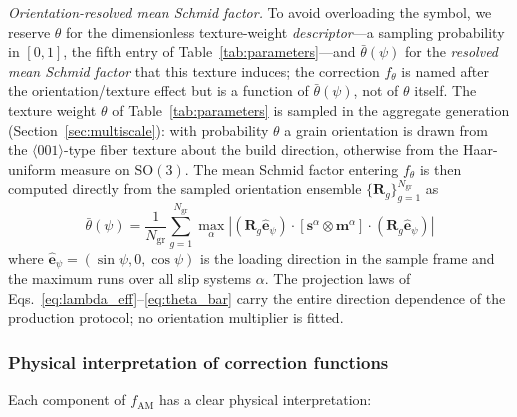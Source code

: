 \emph{Orientation-resolved mean Schmid factor.} To avoid overloading the symbol, we reserve $\theta$ for the dimensionless texture-weight \emph{descriptor}---a sampling probability in $[0,1]$, the fifth entry of Table~\ref{tab:parameters}---and $\bar{\theta}(\psi)$ for the \emph{resolved mean Schmid factor} that this texture induces; the correction $f_\theta$ is named after the orientation/texture effect but is a function of $\bar{\theta}(\psi)$, not of $\theta$ itself. The texture weight $\theta$ of Table~\ref{tab:parameters} is sampled in the aggregate generation (Section~\ref{sec:multiscale}): with probability $\theta$ a grain orientation is drawn from the $\langle001\rangle$-type fiber texture about the build direction, otherwise from the Haar-uniform measure on $\mathrm{SO}(3)$. The mean Schmid factor entering $f_\theta$ is then computed directly from the sampled orientation ensemble $\{\mathbf{R}_g\}_{g=1}^{N_{\mathrm{gr}}}$ as
\begin{equation}
\bar{\theta}(\psi) = \frac{1}{N_{\mathrm{gr}}} \sum_{g=1}^{N_{\mathrm{gr}}} \max_{\alpha} \left| \left(\mathbf{R}_g \hat{\mathbf{e}}_\psi\right) \cdot \left[ \mathbf{s}^\alpha \otimes \mathbf{m}^\alpha \right] \cdot \left(\mathbf{R}_g \hat{\mathbf{e}}_\psi\right) \right|
\label{eq:theta_bar}
\end{equation}
where $\hat{\mathbf{e}}_\psi = (\sin\psi, 0, \cos\psi)$ is the loading direction in the sample frame and the maximum runs over all slip systems $\alpha$. The projection laws of Eqs.~\eqref{eq:lambda_eff}--\eqref{eq:theta_bar} carry the entire direction dependence of the production protocol; no orientation multiplier is fitted.

\subsubsection{Physical interpretation of correction functions}

Each component of $f_{\text{AM}}$ has a clear physical interpretation:

